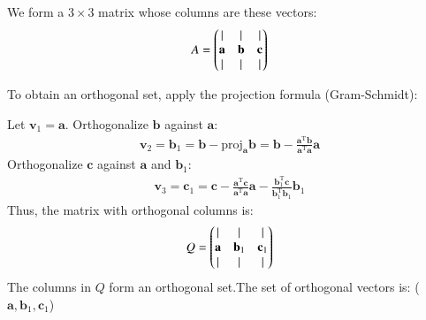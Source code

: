 \documentclass[journal]{IEEEtran}
\theoremstyle{remark}
\begin{document}
We form a $3 \times 3$ matrix whose columns are these vectors:
\begin{align}
A = \begin{pmatrix}| & | & | \\ \mathbf{a} & \mathbf{b} & \mathbf{c} \\ | & | & |\end{pmatrix}
\end{align}

To obtain an orthogonal set, apply the projection formula (Gram-Schmidt):

Let $\mathbf{v}_1 = \mathbf{a}$.
Orthogonalize $\mathbf{b}$ against $\mathbf{a}$:
\begin{align}
\mathbf{v}_2 = \mathbf{b}_1 = \mathbf{b} - \mathrm{proj}_{\mathbf{a}} \mathbf{b}
= \mathbf{b} - \frac{\mathbf{a}^\mathrm{T} \mathbf{b}}{\mathbf{a}^\mathrm{T} \mathbf{a}} \mathbf{a}
\end{align}
Orthogonalize $\mathbf{c}$ against $\mathbf{a}$ and $\mathbf{b}_1$:
\begin{align}
\mathbf{v}_3 = \mathbf{c}_1 
= \mathbf{c} - \frac{\mathbf{a}^\mathrm{T}\mathbf{c}}{\mathbf{a}^\mathrm{T}\mathbf{a}} \mathbf{a} 
  - \frac{\mathbf{b}_1^\mathrm{T}\mathbf{c}}{\mathbf{b}_1^\mathrm{T}\mathbf{b}_1} \mathbf{b}_1
\end{align}
Thus, the matrix with orthogonal columns is:
\begin{align}
Q = \begin{pmatrix}| & | & | \\ \mathbf{a} & \mathbf{b}_1 & \mathbf{c}_1 \\ | & | & | \end{pmatrix}
\end{align}
The columns in $Q$ form an orthogonal set.The set of orthogonal vectors is:
($\mathbf{a},\mathbf{b}_1,\mathbf{c}_1$)
\end{document}
